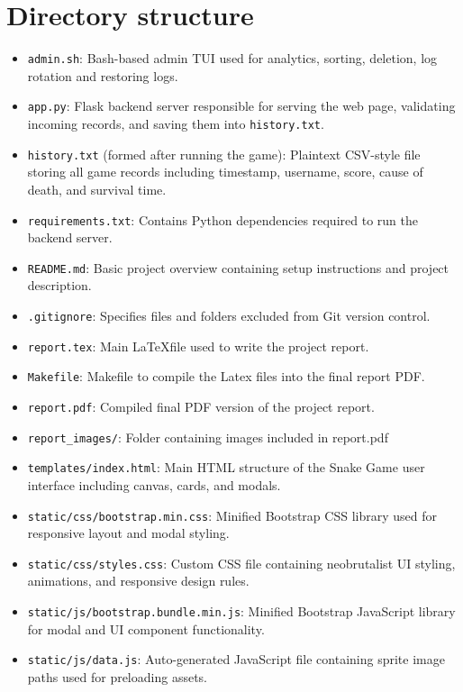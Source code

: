 \documentclass[12pt]{article}
\begin{document}
\section{Directory structure}
\begin{itemize}
    \item \texttt{admin.sh}: Bash-based admin TUI used for analytics, sorting, deletion, log rotation and restoring logs.
    \item \texttt{app.py}: Flask backend server responsible for serving the web page, validating incoming records, and saving them into \texttt{history.txt}.
    \item \texttt{history.txt} (formed after running the game): Plaintext CSV-style file storing all game records including timestamp, username, score, cause of death, and survival time.
    \item \texttt{requirements.txt}: Contains Python dependencies required to run the backend server.
    \item \texttt{README.md}: Basic project overview containing setup instructions and project description.
    \item \texttt{.gitignore}: Specifies files and folders excluded from Git version control.
    \item \texttt{report.tex}: Main \LaTeX  file used to write the project report.
    \item \texttt{Makefile}: Makefile to compile the Latex files into the final report PDF.
    \item \texttt{report.pdf}: Compiled final PDF version of the project report.
    \item \texttt{report\_images/}: Folder containing images included in report.pdf
    \item \texttt{templates/index.html}: Main HTML structure of the Snake Game user interface including canvas, cards, and modals.
    \item \texttt{static/css/bootstrap.min.css}: Minified Bootstrap CSS library used for responsive layout and modal styling.
    \item \texttt{static/css/styles.css}: Custom CSS file containing neobrutalist UI styling, animations, and responsive design rules.
    \item \texttt{static/js/bootstrap.bundle.min.js}: Minified Bootstrap JavaScript library for modal and UI component functionality.
    \item \texttt{static/js/data.js}: Auto-generated JavaScript file containing sprite image paths used for preloading assets.

\end{itemize}
\end{document}
